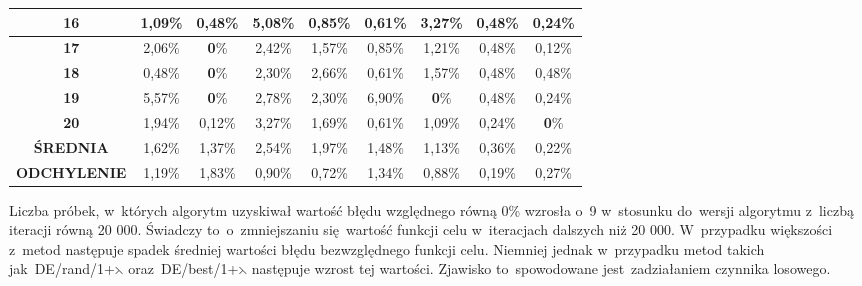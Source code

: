 \begin{itemize}
\begin{table}[h!]
\begin{center}
{\begin{tabular}{|c|c|c|c|c|c|c|c|c|}
\textbf{16}&1,09\%&0,48\%&5,08\%&0,85\%&0,61\%&3,27\%&0,48\%&0,24\% \\ \hline
\textbf{17}&2,06\%&\color{green}\textbf{0}\%&2,42\%&1,57\%&0,85\%&1,21\%&0,48\%&0,12\% \\ \hline
\textbf{18}&0,48\%&\color{green}\textbf{0}\%&2,30\%&2,66\%&0,61\%&1,57\%&0,48\%&0,48\% \\ \hline
\textbf{19}&5,57\%&\color{green}\textbf{0}\%&2,78\%&2,30\%&6,90\%&\color{green}\textbf{0}\%&0,48\%&0,24\% \\ \hline
\textbf{20}&1,94\%&0,12\%&3,27\%&1,69\%&0,61\%&1,09\%&0,24\%&\color{green}\textbf{0}\% \\ \hline
\textbf{ŚREDNIA}&1,62\%&1,37\%&2,54\%&1,97\%&1,48\%&1,13\%&0,36\%&0,22\% \\ \hline
\textbf{ODCHYLENIE}&1,19\%&1,83\%&0,90\%&0,72\%&1,34\%&0,88\%&0,19\%&0,27\% \\ \hline
\end{tabular}}
\label{losowa50}
\end{center}
\end{table}

Liczba próbek, w~których algorytm uzyskiwał wartość błędu względnego równą 0\% wzrosła o~9 w~stosunku do~wersji algorytmu z~liczbą iteracji równą 20 000. Świadczy to~o~zmniejszaniu się~wartość funkcji celu w~iteracjach dalszych niż 20 000. W~przypadku większości z~metod następuje spadek średniej wartości błędu bezwzględnego funkcji celu. Niemniej jednak w~przypadku metod takich jak~DE/rand/1+$\leftthreetimes$ oraz~DE/best/1+$\leftthreetimes$ następuje wzrost tej wartości. Zjawisko to~spowodowane jest~zadziałaniem czynnika losowego. 

\begin{table}[h!]
\begin{center}
\caption{Ranking metod mutacji na podstawie średniej wartości błędu względnego funkcji celu, metoda losowa, 50 000 iteracji.}
\label{ranking3}
\end{center}
\end{table}


\end{itemize}
